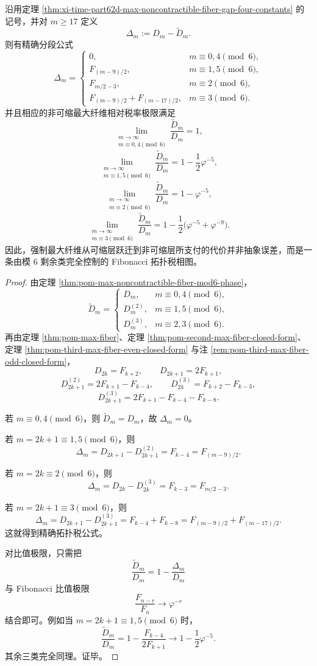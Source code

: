 \begin{corollary}\label{cor:xi-time-part62d-max-noncontractible-fiber-tax-mod6}
沿用定理 \ref{thm:xi-time-part62d-max-noncontractible-fiber-gap-four-constants} 的记号，并对 \(m\ge 17\) 定义
\[
\Delta_m:=D_m-\widetilde D_m.
\]
则有精确分段公式
\[
\boxed{
\Delta_m=
\begin{cases}
0,& m\equiv 0,4\pmod6,\\[1mm]
F_{(m-9)/2},& m\equiv 1,5\pmod6,\\[1mm]
F_{m/2-3},& m\equiv 2\pmod6,\\[1mm]
F_{(m-9)/2}+F_{(m-17)/2},& m\equiv 3\pmod6.
\end{cases}}
\]
并且相应的非可缩最大纤维相对税率极限满足
\[
\lim_{\substack{m\to\infty\\ m\equiv 0,4\!\!\!\!\pmod6}}\frac{\widetilde D_m}{D_m}=1,
\]
\[
\lim_{\substack{m\to\infty\\ m\equiv 1,5\!\!\!\!\pmod6}}\frac{\widetilde D_m}{D_m}
=1-\frac12\varphi^{-5},
\]
\[
\lim_{\substack{m\to\infty\\ m\equiv 2\!\!\!\!\pmod6}}\frac{\widetilde D_m}{D_m}
=1-\varphi^{-5},
\]
\[
\lim_{\substack{m\to\infty\\ m\equiv 3\!\!\!\!\pmod6}}\frac{\widetilde D_m}{D_m}
=1-\frac12\bigl(\varphi^{-5}+\varphi^{-9}\bigr).
\]
因此，强制最大纤维从可缩层跃迁到非可缩层所支付的代价并非抽象误差，而是一条由模 \(6\) 剩余类完全控制的 Fibonacci 拓扑税相图。
\end{corollary}
\begin{proof}
由定理 \ref{thm:pom-max-noncontractible-fiber-mod6-phase}，
\[
\widetilde D_m=
\begin{cases}
D_m,& m\equiv 0,4\pmod 6,\\[2pt]
D_m^{(2)},& m\equiv 1,5\pmod 6,\\[2pt]
D_m^{(3)},& m\equiv 2,3\pmod 6.
\end{cases}
\]
再由定理 \ref{thm:pom-max-fiber}、定理 \ref{thm:pom-second-max-fiber-closed-form}、定理 \ref{thm:pom-third-max-fiber-even-closed-form} 与注 \ref{rem:pom-third-max-fiber-odd-closed-form}，
\[
D_{2k}=F_{k+2},\qquad D_{2k+1}=2F_{k+1},
\]
\[
D_{2k+1}^{(2)}=2F_{k+1}-F_{k-4},\qquad
D_{2k}^{(3)}=F_{k+2}-F_{k-3},
\]
\[
D_{2k+1}^{(3)}=2F_{k+1}-F_{k-4}-F_{k-8}.
\]

若 \(m\equiv 0,4\pmod 6\)，则 \(\widetilde D_m=D_m\)，故 \(\Delta_m=0\)。

若 \(m=2k+1\equiv 1,5\pmod 6\)，则
\[
\Delta_m=D_{2k+1}-D_{2k+1}^{(2)}=F_{k-4}=F_{(m-9)/2}.
\]

若 \(m=2k\equiv 2\pmod 6\)，则
\[
\Delta_m=D_{2k}-D_{2k}^{(3)}=F_{k-3}=F_{m/2-3}.
\]

若 \(m=2k+1\equiv 3\pmod 6\)，则
\[
\Delta_m=D_{2k+1}-D_{2k+1}^{(3)}=F_{k-4}+F_{k-8}
=F_{(m-9)/2}+F_{(m-17)/2}.
\]
这就得到精确拓扑税公式。

对比值极限，只需把
\[
\frac{\widetilde D_m}{D_m}=1-\frac{\Delta_m}{D_m}
\]
与 Fibonacci 比值极限
\[
\frac{F_{n-r}}{F_n}\longrightarrow \varphi^{-r}
\]
结合即可。例如当 \(m=2k+1\equiv 1,5\pmod 6\) 时，
\[
\frac{\widetilde D_m}{D_m}
=
1-\frac{F_{k-4}}{2F_{k+1}}
\longrightarrow
1-\frac12\varphi^{-5}.
\]
其余三类完全同理。证毕。
\end{proof}


